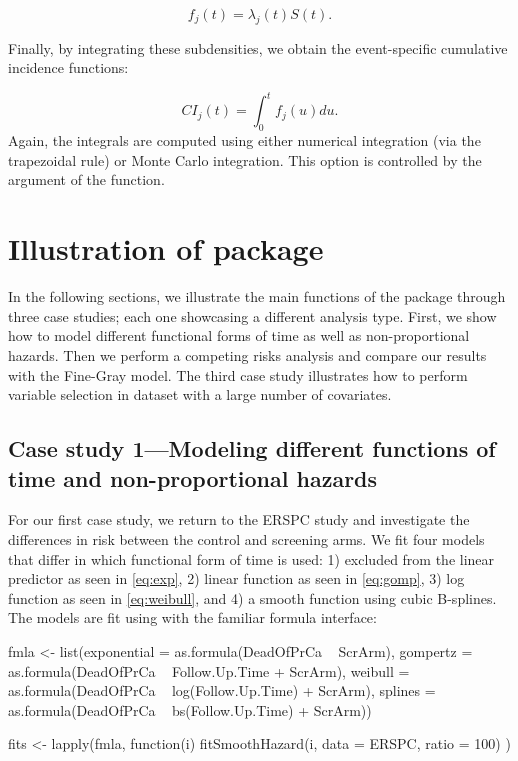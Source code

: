 \[ f_j(t) = \lambda_j(t)S(t).\]

Finally, by integrating these subdensities, we obtain the event-specific
cumulative incidence functions:

\[ CI_j(t) = \int_0^t f_j(u)du.\] Again, the integrals are computed
using either numerical integration (via the trapezoidal rule) or Monte
Carlo integration. This option is controlled by the argument
 of the  function.

\hypertarget{illustration-of-package}{%
\section{Illustration of package}\label{illustration-of-package}}

In the following sections, we illustrate the main functions of the
 package through three case studies; each one showcasing a
different analysis type. First, we show how to model different
functional forms of time as well as non-proportional hazards. Then we
perform a competing risks analysis and compare our results with the
Fine-Gray model. The third case study illustrates how to perform
variable selection in dataset with a large number of covariates.

\hypertarget{case-study-1modeling-different-functions-of-time-and-non-proportional-hazards}{%
\subsection{Case study 1---Modeling different functions of time and
non-proportional
hazards}\label{case-study-1modeling-different-functions-of-time-and-non-proportional-hazards}}

For our first case study, we return to the ERSPC study and investigate
the differences in risk between the control and screening arms. We fit
four models that differ in which functional form of time is used: 1)
excluded from the linear predictor as seen in \eqref{eq:exp}, 2) linear
function as seen in \eqref{eq:gomp}, 3) log function as seen in
\eqref{eq:weibull}, and 4) a smooth function using cubic B-splines. The
models are fit using  with the familiar formula
interface:

\begin{Schunk}
\begin{Sinput}
fmla <- list(exponential = as.formula(DeadOfPrCa ~ ScrArm),
             gompertz = as.formula(DeadOfPrCa ~ Follow.Up.Time + ScrArm),
             weibull = as.formula(DeadOfPrCa ~ log(Follow.Up.Time) + ScrArm),
             splines = as.formula(DeadOfPrCa ~ bs(Follow.Up.Time) + ScrArm))

fits <- lapply(fmla, function(i) {
  fitSmoothHazard(i, data = ERSPC, ratio = 100)
})
\end{Sinput}
\end{Schunk}

